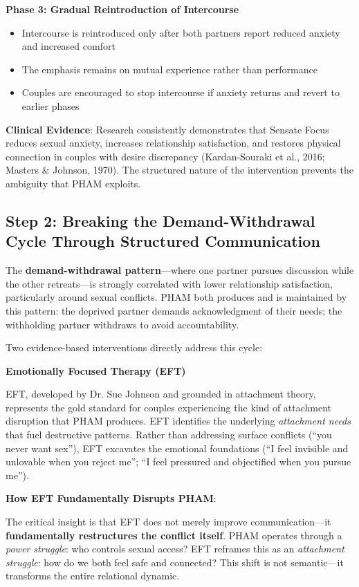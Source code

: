 \documentclass[12pt,openany]{book}
\numberwithin{equation}{chapter}
\begin{document}
\textbf{Phase 3: Gradual Reintroduction of Intercourse}
\begin{itemize}
    \item Intercourse is reintroduced only after both partners report reduced anxiety and increased comfort
    \item The emphasis remains on mutual experience rather than performance
    \item Couples are encouraged to stop intercourse if anxiety returns and revert to earlier phases
\end{itemize}

\textbf{Clinical Evidence}: Research consistently demonstrates that Sensate Focus reduces sexual anxiety, increases relationship satisfaction, and restores physical connection in couples with desire discrepancy (Kardan-Souraki et al., 2016; Masters \& Johnson, 1970). The structured nature of the intervention prevents the ambiguity that PHAM exploits.

\subsection{Step 2: Breaking the Demand-Withdrawal Cycle Through Structured Communication}

The \textbf{demand-withdrawal pattern}---where one partner pursues discussion while the other retreats---is strongly correlated with lower relationship satisfaction, particularly around sexual conflicts. PHAM both produces and is maintained by this pattern: the deprived partner demands acknowledgment of their needs; the withholding partner withdraws to avoid accountability.

Two evidence-based interventions directly address this cycle:

\textbf{Emotionally Focused Therapy (EFT)}

EFT, developed by Dr. Sue Johnson and grounded in attachment theory, represents the gold standard for couples experiencing the kind of attachment disruption that PHAM produces. EFT identifies the underlying \textit{attachment needs} that fuel destructive patterns. Rather than addressing surface conflicts (``you never want sex''), EFT excavates the emotional foundations (``I feel invisible and unlovable when you reject me''; ``I feel pressured and objectified when you pursue me'').

\textbf{How EFT Fundamentally Disrupts PHAM}:

The critical insight is that EFT does not merely improve communication---it \textbf{fundamentally restructures the conflict itself}. PHAM operates through a \textit{power struggle}: who controls sexual access? EFT reframes this as an \textit{attachment struggle}: how do we both feel safe and connected? This shift is not semantic---it transforms the entire relational dynamic.
\end{document}
